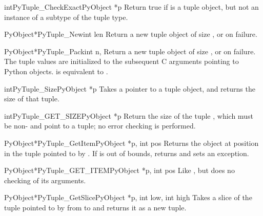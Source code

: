 \begin{cfuncdesc}{int}{PyTuple_CheckExact}{PyObject *p}
  Return true if  is a tuple object, but not an instance of a
  subtype of the tuple type.
\end{cfuncdesc}

\begin{cfuncdesc}{PyObject*}{PyTuple_New}{int len}
  Return a new tuple object of size , or \NULL{} on failure.
\end{cfuncdesc}

\begin{cfuncdesc}{PyObject*}{PyTuple_Pack}{int n, \moreargs}
  Return a new tuple object of size , or \NULL{} on failure.
  The tuple values are initialized to the subsequent  C arguments
  pointing to Python objects.  
  is equivalent to .
\end{cfuncdesc}

\begin{cfuncdesc}{int}{PyTuple_Size}{PyObject *p}
  Takes a pointer to a tuple object, and returns the size of that
  tuple.
\end{cfuncdesc}

\begin{cfuncdesc}{int}{PyTuple_GET_SIZE}{PyObject *p}
  Return the size of the tuple , which must be non-\NULL{} and
  point to a tuple; no error checking is performed.
\end{cfuncdesc}

\begin{cfuncdesc}{PyObject*}{PyTuple_GetItem}{PyObject *p, int pos}
  Returns the object at position  in the tuple pointed to by
  .  If  is out of bounds, returns \NULL{} and sets an
   exception.
\end{cfuncdesc}

\begin{cfuncdesc}{PyObject*}{PyTuple_GET_ITEM}{PyObject *p, int pos}
  Like , but does no checking of its
  arguments.
\end{cfuncdesc}

\begin{cfuncdesc}{PyObject*}{PyTuple_GetSlice}{PyObject *p,
                                               int low, int high}
  Takes a slice of the tuple pointed to by  from  to
   and returns it as a new tuple.
\end{cfuncdesc}

